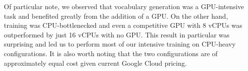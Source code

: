 \documentclass[11pt]{article}
\begin{document}
\begin{appendices}
Of particular note, we observed that vocabulary generation was a GPU-intensive task and benefited greatly from the addition of a GPU. On the other hand, training was CPU-bottlenecked and even a competitive GPU with 8 vCPUs was outperformed by just 16 vCPUs with no GPU. This result in particular was surprising and led us to perform most of our intensive training on CPU-heavy configurations. It is also worth noting that the two configurations are of approximately equal cost given current Google Cloud pricing.

\end{appendices}
\end{document}

